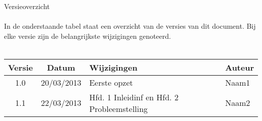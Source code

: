 {\Huge Versieoverzicht} \\
\\
In de onderstaande tabel staat een overzicht van de versies van dit document. Bij elke versie zijn de belangrijkste wijzigingen genoteerd.\\
\\
	\begin{tabular}{|c|c|l|l|}
		\hline
		Versie & Datum & Wijzigingen & Auteur \\ \hline
		1.0	& 20/03/2013 & Eerste opzet & Naam1	\\ \hline
		1.1	& 22/03/2013 & Hfd. 1 Inleidinf en Hfd. 2 Probleemstelling & Naam2	\\ \hline
	\end {tabular}
\pagebreak
